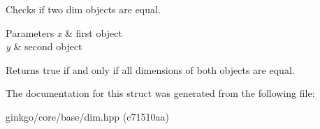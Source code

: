 Checks if two dim objects are equal. 


\begin{DoxyParams}{Parameters}
{\em x} & first object \\
\hline
{\em y} & second object\\
\hline
\end{DoxyParams}
\begin{DoxyReturn}{Returns}
true if and only if all dimensions of both objects are equal. 
\end{DoxyReturn}


The documentation for this struct was generated from the following file\+:\begin{DoxyCompactItemize}
\item 
ginkgo/core/base/dim.\+hpp (c71510aa)\end{DoxyCompactItemize}
